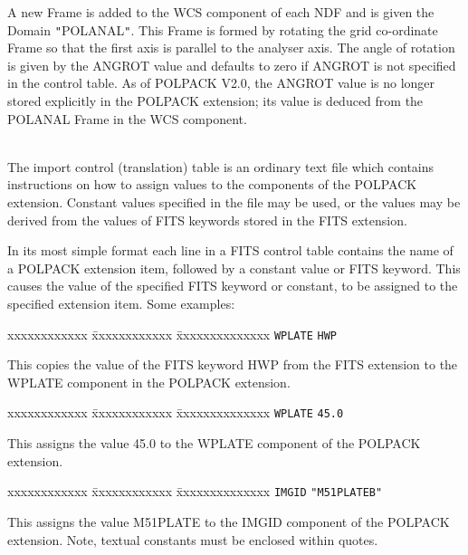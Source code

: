 \documentclass[twoside,11pt]{article}
\renewcommand{\_}{\texttt{\symbol{95}}}
\newcommand{\sstdiytopic}[2]{\item[{\hspace{-0.35em}#1\hspace{-0.35em}:}]
\mbox{} \\[1.3ex] #2}
\newcommand{\sstitem}{\item}
\newcommand{\sstdiytopic}[2]{\item[{#1}] #2 }
\newcommand{\sstitem}{\item}
\begin{document}
{{{         \sstitem
         A new Frame is added to the WCS component of each NDF and is given the
         Domain {\tt "}POLANAL{\tt "}. This Frame is formed by rotating the grid co-ordinate
         Frame so that the first axis is parallel to the analyser axis. The
         angle of rotation is given by the ANGROT value and defaults to zero
         if ANGROT is not specified in the control table. As of POLPACK V2.0,
         the ANGROT value is no longer stored explicitly in the POLPACK
         extension; its value is deduced from the POLANAL Frame in the WCS
         component.
      }
   }
   \sstdiytopic{
      Table Format
   }{
      The import control (translation) table is an ordinary text file
      which contains instructions on how to assign values to the components
      of the POLPACK extension. Constant values specified in
      the file may be used, or the values may be derived from the values
      of FITS keywords stored in the FITS extension.

      In its most simple format each line in a FITS control table contains
      the name of a POLPACK extension item, followed by a constant value
      or FITS keyword. This causes the value of the specified FITS keyword
      or constant, to be assigned to the specified extension item. Some
      examples:

\begin{tabbing}
 xxxxxxxxxxxx \= xxxxxxxxxxxx            \= xxxxxxxxxxxxxx \kill
              \>  \texttt{WPLATE}        \> \texttt{HWP}  
\end{tabbing}

      This copies the value of the FITS keyword HWP from the FITS
      extension to the WPLATE component in the POLPACK extension.

\begin{tabbing}
 xxxxxxxxxxxx \= xxxxxxxxxxxx            \= xxxxxxxxxxxxxx \kill
              \>  \texttt{WPLATE}        \> \texttt{45.0}  
\end{tabbing}

      This assigns the value 45.0 to the WPLATE component of the POLPACK
      extension.

\begin{tabbing}
 xxxxxxxxxxxx \= xxxxxxxxxxxx            \= xxxxxxxxxxxxxx \kill
              \>  \texttt{IMGID}        \> \texttt{"M51\_PLATEB"}  
\end{tabbing}

      This assigns the value M51\_PLATE to the IMGID component of the
      POLPACK extension. Note, textual constants must be enclosed within
      quotes.

}}
\end{document}
